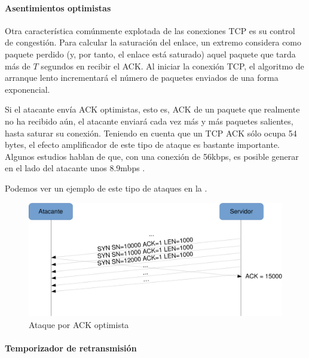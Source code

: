 \paragraph{Asentimientos optimistas}\mbox{\newline}

Otra característica comúnmente explotada de las conexiones \gls{TCP} es su control de congestión. Para calcular la saturación del enlace, un extremo considera como paquete perdido (y, por tanto, el 
enlace está saturado) aquel paquete que tarda más de $T$ segundos en recibir el ACK. Al iniciar la conexión \gls{TCP}, el 
algoritmo de arranque lento incrementará el número de paquetes enviados de una forma exponencial.

Si el atacante envía \gls{ACK} optimistas, esto es, \gls{ACK} de un paquete que realmente no ha recibido aún, el atacante enviará 
cada vez más y más paquetes salientes, hasta saturar su conexión. Teniendo en cuenta que un \gls{TCP} \gls{ACK} sólo ocupa 54 
bytes, el efecto amplificador de este tipo de ataque es bastante importante. Algunos estudios hablan de que, con una 
conexión de 56kbps, es posible generar en el lado del atacante unos 8.9mbps \cite{sherwood}.

Podemos ver un ejemplo de este tipo de ataques en la .

\begin{figure}[htbp]
\centering
\includegraphics[width=\textwidth]{CapituloDDoS/Figuras/optim_ACK_attack}
\caption{Ataque por ACK optimista}
\end{figure}
%

\paragraph{Temporizador de retransmisión}\mbox{\newline}

